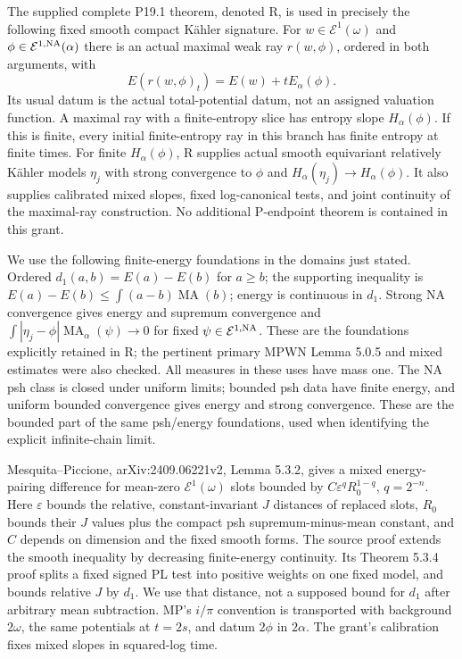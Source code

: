 \documentclass[
  11pt,
]{article}
\begin{document}
The supplied complete P19.1 theorem, denoted R, is used in precisely the
following fixed smooth compact Kähler signature. For
\(w\in\mathcal E^1(\omega)\) and
\(\phi\in\mathcal E^{1,\rm NA}(\alpha)\) there is an actual maximal weak
ray \(r(w,\phi)\), ordered in both arguments, with
\[ E(r(w,\phi)_t)=E(w)+tE_\alpha(\phi). \tag{3.1}\] Its usual datum is
the actual total-potential datum, not an assigned valuation function. A
maximal ray with a finite-entropy slice has entropy slope
\(H_\alpha(\phi)\). If this is finite, every initial finite-entropy ray
in this branch has finite entropy at finite times. For finite
\(H_\alpha(\phi)\), R supplies actual smooth equivariant relatively
Kähler models \(\eta_j\) with strong convergence to \(\phi\) and
\(H_\alpha(\eta_j)\to H_\alpha(\phi)\). It also supplies calibrated
mixed slopes, fixed log-canonical tests, and joint continuity of the
maximal-ray construction. No additional P-endpoint theorem is contained
in this grant.

We use the following finite-energy foundations in the domains just
stated. Ordered \(d_1(a,b)=E(a)-E(b)\) for \(a\geq b\); the supporting
inequality is \(E(a)-E(b)\leq\int(a-b)\operatorname{MA}(b)\); energy is
continuous in \(d_1\). Strong NA convergence gives energy and supremum
convergence and \(\int|\eta_j-\phi|\operatorname{MA}_\alpha(\psi)\to0\)
for fixed \(\psi\in\mathcal E^{1,\rm NA}\). These are the foundations
explicitly retained in R; the pertinent primary MPWN Lemma 5.0.5 and
mixed estimates were also checked. All measures in these uses have mass
one. The NA psh class is closed under uniform limits; bounded psh data
have finite energy, and uniform bounded convergence gives energy and
strong convergence. These are the bounded part of the same psh/energy
foundations, used when identifying the explicit infinite-chain limit.

Mesquita--Piccione, arXiv:2409.06221v2, Lemma 5.3.2, gives a mixed
energy-pairing difference for mean-zero \(\mathcal E^1(\omega)\) slots
bounded by \(C\varepsilon^q R_0^{1-q}\), \(q=2^{-n}\). Here
\(\varepsilon\) bounds the relative, constant-invariant \(J\) distances
of replaced slots, \(R_0\) bounds their \(J\) values plus the compact
psh supremum-minus-mean constant, and \(C\) depends on dimension and the
fixed smooth forms. The source proof extends the smooth inequality by
decreasing finite-energy continuity. Its Theorem 5.3.4 proof splits a
fixed signed PL test into positive weights on one fixed model, and
bounds relative \(J\) by \(d_1\). We use that distance, not a supposed
bound for \(d_1\) after arbitrary mean subtraction. MP's \(i/\pi\)
convention is transported with background \(2\omega\), the same
potentials at \(t=2s\), and datum \(2\phi\) in \(2\alpha\). The grant's
calibration fixes mixed slopes in squared-log time.
\end{document}
